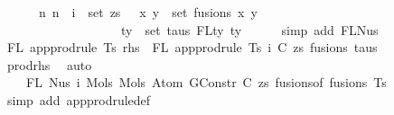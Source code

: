 \begin{isabellebody}
\ \ \ \ \ \ {\isacharbraceleft}{\kern0pt}n{\isachardot}{\kern0pt}\ n\ {\isacharplus}{\kern0pt}\ i\ {\isasymin}\ set\ zs\ {\isasymunion}\ {\isacharparenleft}{\kern0pt}{\isasymUnion}\ {\isacharparenleft}{\kern0pt}x{\isacharcomma}{\kern0pt}\ y{\isacharparenright}{\kern0pt}\ {\isasymin}\ set\ fusions{\isachardot}{\kern0pt}\ {\isacharbraceleft}{\kern0pt}x{\isacharcomma}{\kern0pt}\ y{\isacharbraceright}{\kern0pt}{\isacharparenright}{\kern0pt}\isanewline
\ \ \ \ \ \ \ \ \ \ \ \ \ \ \ \ \ {\isasymunion}\ {\isacharparenleft}{\kern0pt}{\isasymUnion}\ ty\ {\isasymin}\ set\ taus{\isachardot}{\kern0pt}\ FLty\ ty{\isacharparenright}{\kern0pt}{\isacharbraceright}{\kern0pt}{\isachardoublequoteclose}\isanewline
\ \ \ \ \isamarkupfalse%
\ {\isacharparenleft}{\kern0pt}simp\ add{\isacharcolon}{\kern0pt}\ FL{\isacharunderscore}{\kern0pt}Nus{}{\isacharparenright}{\kern0pt}\isanewline
\isanewline
\isanewline
\ \ \isamarkupfalse%
\ {\isachardoublequoteopen}FL\ {\isacharparenleft}{\kern0pt}app{\isacharunderscore}{\kern0pt}prodrule\ Ts\ rhs{\isacharparenright}{\kern0pt}\ {\isacharequal}{\kern0pt}\ FL\ {\isacharparenleft}{\kern0pt}app{\isacharunderscore}{\kern0pt}prodrule\ Ts\ {\isacharparenleft}{\kern0pt}i{\isacharcomma}{\kern0pt}\ {\isacharparenleft}{\kern0pt}C{\isacharcomma}{\kern0pt}\ zs{\isacharparenright}{\kern0pt}{\isacharcomma}{\kern0pt}\ fusions{\isacharcomma}{\kern0pt}\ taus{\isacharparenright}{\kern0pt}{\isacharparenright}{\kern0pt}{\isachardoublequoteclose}\isanewline
\ \ \ \ \isamarkupfalse%
\ prod{\isacharunderscore}{\kern0pt}rhs{}\ \isamarkupfalse%
\ auto\isanewline
\ \ \isamarkupfalse%
\ \isamarkupfalse%
\ {\isachardoublequoteopen}{\isachardot}{\kern0pt}{\isachardot}{\kern0pt}{\isachardot}{\kern0pt}\ {\isacharequal}{\kern0pt}\isanewline
\ \ \ \ FL\ {\isacharparenleft}{\kern0pt}Nus{}\ i\ {\isacharparenleft}{\kern0pt}Mols{}\ {\isacharparenleft}{\kern0pt}Mols{}\ {\isacharparenleft}{\kern0pt}Atom\ {\isacharparenleft}{\kern0pt}GConstr\ C{\isacharparenright}{\kern0pt}\ zs{\isacharparenright}{\kern0pt}\ {\isacharparenleft}{\kern0pt}fusions{\isacharunderscore}{\kern0pt}of\ fusions{\isacharparenright}{\kern0pt}{\isacharparenright}{\kern0pt}\ Ts{\isacharparenright}{\kern0pt}{\isacharparenright}{\kern0pt}{\isachardoublequoteclose}\isanewline
\ \ \ \ \isamarkupfalse%
\ {\isacharparenleft}{\kern0pt}simp\ add{\isacharcolon}{\kern0pt}\ app{\isacharunderscore}{\kern0pt}prodrule{\isacharunderscore}{\kern0pt}def{\isacharparenright}{\kern0pt}\isanewline

\end{isabellebody}
